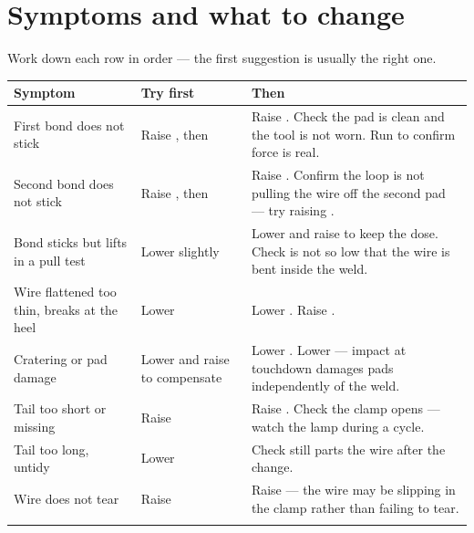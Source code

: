 \section{Symptoms and what to change}

Work down each row in order --- the first suggestion is usually the right one.

\begin{center}\footnotesize
\begin{tabular}{@{}L{34mm}L{40mm}L{46mm}@{}}
\toprule
\textbf{Symptom} & \textbf{Try first} & \textbf{Then} \\
\midrule

First bond does not stick &
Raise , then  &
Raise . Check the pad is clean and the tool is not worn.
Run  to confirm force is real. \\
\addlinespace

Second bond does not stick &
Raise , then  &
Raise . Confirm the loop is not pulling the wire off the
second pad --- try raising . \\
\addlinespace

Bond sticks but lifts in a pull test &
Lower  slightly &
Lower  and raise  to keep the dose. Check
 is not so low that the wire is bent inside the weld. \\
\addlinespace

Wire flattened too thin, breaks at the heel &
Lower  &
Lower . Raise . \\
\addlinespace

Cratering or pad damage &
Lower  and raise  to compensate &
Lower . Lower  --- impact at touchdown
damages pads independently of the weld. \\
\addlinespace

Tail too short or missing &
Raise  &
Raise . Check the clamp opens --- watch the
 lamp during a cycle. \\
\addlinespace

Tail too long, untidy &
Lower  &
Check  still parts the wire after the change. \\
\addlinespace

Wire does not tear &
Raise  &
Raise  --- the wire may be slipping in the clamp rather
than failing to tear. \\
\addlinespace


\end{tabular}
\end{center}
